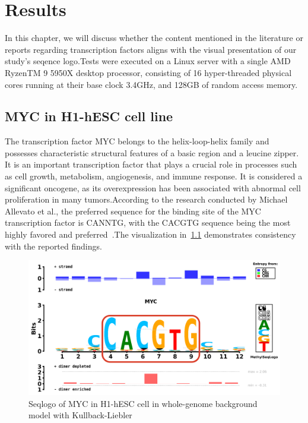 \documentclass{PHlab-thesis}
\begin{document}
\chapter{Results} 
In this chapter, we will discuss whether the content mentioned in the literature or reports regarding transcription factors aligns with the visual presentation of our study's seqence logo.Tests were executed on a Linux server with a single AMD RyzenTM 9 5950X desktop processor, consisting of 16 hyper-threaded physical cores running at their base clock 3.4GHz, and 128GB of random access memory.
\section{MYC in H1-hESC cell line}
The transcription factor MYC belongs to the helix-loop-helix family and possesses characteristic structural features of a basic region and a leucine zipper. It is an important transcription factor that plays a crucial role in processes such as cell growth, metabolism, angiogenesis, and immune response. It is considered a significant oncogene, as its overexpression has been associated with abnormal cell proliferation in many tumors.According to the research conducted by Michael Allevato et al., the preferred sequence for the binding site of the MYC transcription factor is CANNTG, with the CACGTG sequence being the most highly favored and preferred~\cite{allevato2017sequence}.The visualization in~\ref{fig:MYC} demonstrates consistency with the reported findings.

\begin{figure}[H]
	\centering
	\includegraphics[scale=0.4]{figures/MYC.png}
	\caption{Seqlogo of MYC in H1-hESC cell in whole-genome background model with Kullback-Liebler}
	\label{fig:MYC} 
\end{figure}
\end{document}
